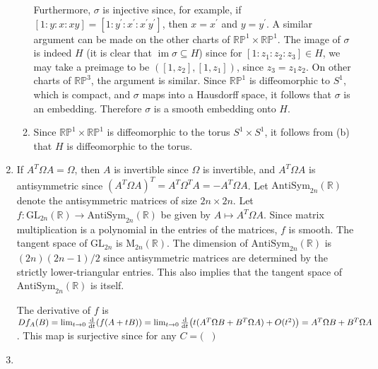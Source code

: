 \documentclass[11pt,leqno]{article}
\theoremstyle{plain}
\theoremstyle{definition}
\numberwithin{equation}{section}
\numberwithin{lem}{section}
\DeclareMathOperator{\im}{im}
\newcommand{\GL}{\mathrm{GL}}
\newcommand{\Mat}{\mathrm{M}}
\newcommand{\AS}{\mathrm{AntiSym}}
\begin{document}
\begin{enumerate}
\begin{enumerate}
      Furthermore, $\sigma$ is injective since, for example, if $[1:y:x:xy] = [1:y^\prime:x^\prime:x^\prime y^\prime]$, then $x = x^\prime$ and $y = y^\prime$. A similar argument can be made on the other charts of $\mathbb{RP}^1\times\mathbb{RP}^1$. The image of $\sigma$ is indeed $H$ (it is clear that $\im \sigma\subseteq H$) since for $[1:z_1:z_2:z_3]\in H$, we may take a preimage to be $([1,z_2],[1,z_1])$, since $z_3 = z_1z_2$. On other charts of $\mathbb{RP}^3$, the argument is similar. Since $\mathbb{RP}^1$ is diffeomorphic to $S^1$, which is compact, and $\sigma$ maps into a Hausdorff space, it follows that $\sigma$ is an embedding. Therefore $\sigma$ is a smooth embedding onto $H$.
      \item Since $\mathbb{RP}^1\times\mathbb{RP}^1$ is diffeomorphic to the torus $S^1\times S^1$, it follows from (b) that $H$ is diffeomorphic to the torus.
    \end{enumerate}
    \item If $A^T\Omega A = \Omega$, then $A$ is invertible since $\Omega$ is invertible, and $A^T\Omega A$ is antisymmetric since $(A^T\Omega A)^T = A^T\Omega^T A = -A^T\Omega A$. Let $\AS_{2n}(\mathbb R)$ denote the antisymmetric matrices of size $2n\times 2n$. Let $f\colon \GL_{2n}(\mathbb R)\to\AS_{2n}(\mathbb R)$ be given by $A\mapsto A^T\Omega A$. Since matrix multiplication is a polynomial in the entries of the matrices, $f$ is smooth. The tangent space of $\GL_{2n}$ is $\Mat_{2n}(\mathbb R)$. The dimension of $\AS_{2n}(\mathbb R)$ is $(2n)(2n-1)/2$ since antisymmetric matrices are determined by the strictly lower-triangular entries. This also implies that the tangent space of $\AS_{2n}(\mathbb R)$ is itself.
    
    The derivative of $f$ is $Df_A(B) = \lim_{t\to 0}\dv{t}(f(A+tB)) = \lim_{t\to 0}\dv{t}(t(A^T\Omega B + B^T\Omega A) + O(t^2)) = A^T\Omega B + B^T\Omega A$. This map is surjective since for any $C = \Big(\begin{smallmatrix}
      
    \end{smallmatrix}\Big)$
    \item 
\end{enumerate}
\end{document}
